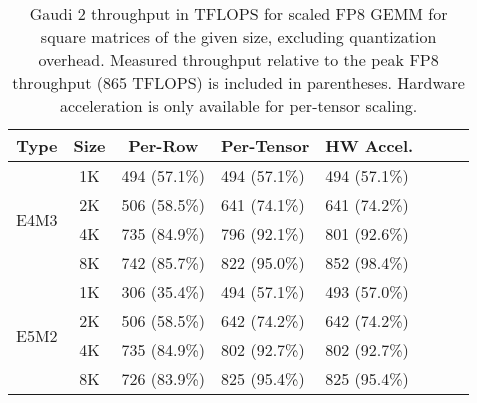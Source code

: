 \begin{table}[ht]
\caption{Gaudi 2 throughput in TFLOPS for scaled FP8 GEMM for square matrices of the given size, excluding quantization overhead. Measured throughput relative to the peak FP8 throughput (865 TFLOPS) is included in parentheses. Hardware acceleration is only available for per-tensor scaling.}
\centering
\begin{tabular}{@{}ccllllll@{}}
\toprule
Type &
Size &
\multicolumn{1}{c}{Per-Row} &
\multicolumn{1}{c}{Per-Tensor} &
\multicolumn{1}{c}{HW Accel.} \\ \midrule
\multirow{4}{*}{E4M3} & 1K & 494 (57.1\%) & 494 (57.1\%) & 494 (57.1\%) \\
                      & 2K & 506 (58.5\%) & 641 (74.1\%) & 641 (74.2\%) \\
                      & 4K & 735 (84.9\%) & 796 (92.1\%) & 801 (92.6\%) \\
                      & 8K & 742 (85.7\%) & 822 (95.0\%) & 852 (98.4\%) \\ \midrule
\multirow{4}{*}{E5M2} & 1K & 306 (35.4\%) & 494 (57.1\%) & 493 (57.0\%) \\
                      & 2K & 506 (58.5\%) & 642 (74.2\%) & 642 (74.2\%) \\
                      & 4K & 735 (84.9\%) & 802 (92.7\%) & 802 (92.7\%) \\
                      & 8K & 726 (83.9\%) & 825 (95.4\%) & 825 (95.4\%) \\ \bottomrule
\end{tabular}
\label{tab:gaudi2_fp8_tflops}
\end{table}

